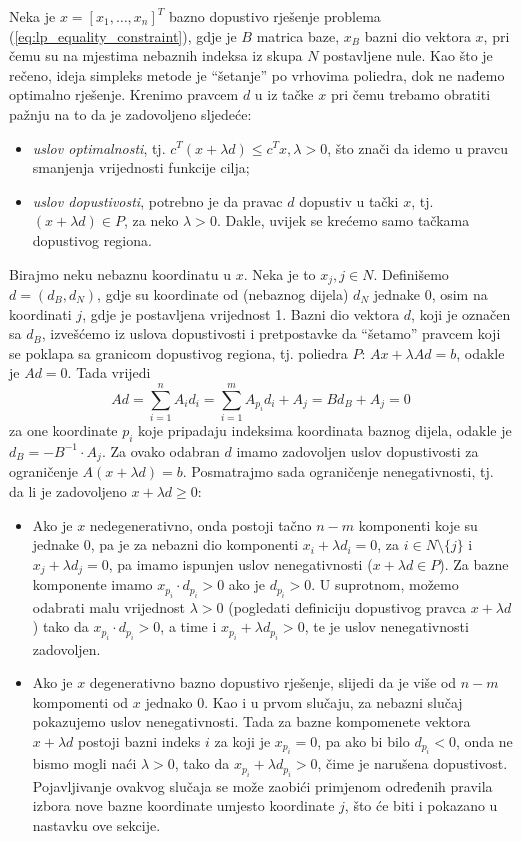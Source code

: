 \documentclass[a4paper, utf8, 11pt, colorlinks]{book}
\theoremstyle{definition}
\begin{document}
 Neka je $x = [x_1,\ldots, x_n]^T$ bazno dopustivo rješenje problema (\ref{eq:lp_equality_constraint}), gdje je $B$ matrica baze, $x_B$ bazni dio vektora $x$, pri čemu su na mjestima nebaznih indeksa iz skupa $N$ postavljene nule.  Kao što je rečeno, ideja simpleks metode je  ``šetanje'' po vrhovima poliedra,  dok ne nađemo optimalno rješenje. Krenimo pravcem $d$ u iz tačke $x$  pri čemu trebamo obratiti  pažnju na to da je zadovoljeno sljedeće:
\begin{itemize}
    \item \emph{uslov optimalnosti}, tj. $c^T (x + \lambda d) \leq c^T x, \lambda>0$, što znači da idemo u pravcu smanjenja vrijednosti funkcije cilja;
    \item \emph{uslov dopustivosti}, potrebno je da pravac $d$ dopustiv u tački $x$, tj. $ (x + \lambda d) \in P$, za neko $\lambda>0$. Dakle, uvijek se krećemo samo tačkama dopustivog regiona. 
\end{itemize}
Birajmo neku nebaznu koordinatu u $x$. Neka je to $x_j, j \in N$. Definišemo $d=(d_B,  d_N)$, gdje su koordinate od (nebaznog dijela) $d_N$ jednake 0, osim na koordinati $j$, gdje je postavljena vrijednost 1.   Bazni dio vektora $d$, koji je označen sa $d_B$, izvešćemo iz uslova dopustivosti i pretpostavke da ``šetamo'' pravcem koji se poklapa sa granicom dopustivog regiona, tj. poliedra $P$: $Ax + \lambda Ad = b$, odakle je $Ad = 0$. Tada vrijedi
$$ Ad = \sum_{i=1}^n A_i d_i = \sum_{i=1}^m A_{p_i} d_i + A_j = B d_B + A_j = 0$$ za one koordinate $p_i$ koje pripadaju indeksima koordinata baznog dijela, 
odakle je $d_B = -  B^{-1} \cdot A_j $.  Za ovako odabran $d$ imamo zadovoljen uslov dopustivosti za ograničenje $A( x + \lambda d )  =b$. Posmatrajmo sada ograničenje nenegativnosti, tj. da li je zadovoljeno $x + \lambda d \geq 0$:
\begin{itemize}
    \item Ako je $x$ nedegenerativno, onda postoji tačno $n-m$ komponenti koje su jednake 0, pa je za nebazni dio komponenti $x_i + \lambda d_i = 0$, za $i \in N \setminus \{j\}$ i $x_j + \lambda d_j = 0$, pa imamo ispunjen uslov nenegativnosti ($x + \lambda d\in P$). Za bazne komponente imamo $x_{p_i} \cdot d_{p_i} > 0 $ ako je $d_{p_i}>0$. U suprotnom, možemo odabrati  malu vrijednost  $\lambda>0$ (pogledati definiciju dopustivog pravca $x +\lambda d$) tako da $x_{p_i} \cdot d_{p_i} >0$, a time i $x_{p_i} + \lambda d_{p_i}>0$, te je uslov nenegativnosti zadovoljen.
 
    \item Ako je $x$ degenerativno bazno dopustivo rješenje, slijedi da je više od $n-m$ kompomenti od $x$ jednako 0. Kao i u prvom slučaju, za nebazni slučaj pokazujemo uslov nenegativnosti. Tada za bazne kompomenete vektora $x +\lambda d$  postoji bazni indeks $i$ za koji je $x_{p_i} = 0$, pa ako bi bilo $d_{p_i}< 0$, onda ne bismo mogli naći $\lambda>0$, tako da $x_{p_i} + \lambda d_{p_i} >0$, čime je narušena dopustivost. Pojavljivanje ovakvog slučaja se može zaobići primjenom određenih pravila izbora nove bazne koordinate umjesto koordinate $j$, što će biti i pokazano u nastavku ove sekcije. 
\end{itemize}
\end{document}
